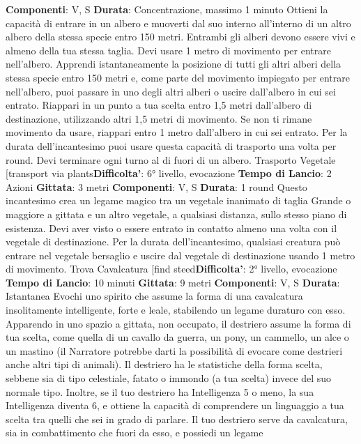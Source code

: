 \begin{multicols}{2}
\textbf{Componenti}: V, S
\textbf{Durata}: Concentrazione, massimo 1 minuto
Ottieni la capacità di entrare in un albero e muoverti dal
suo interno all’interno di un altro albero della stessa
specie entro 150 metri. Entrambi gli alberi devono
essere vivi e almeno della tua stessa taglia. Devi usare
1 metro di movimento per entrare nell’albero. Apprendi
istantaneamente la posizione di tutti gli altri alberi della
stessa specie entro 150 metri e, come parte del
movimento impiegato per entrare nell’albero, puoi
passare in uno degli altri alberi o uscire dall’albero in cui
sei entrato. Riappari in un punto a tua scelta entro 1,5
metri dall’albero di destinazione, utilizzando altri 1,5
metri di movimento. Se non ti rimane movimento da
usare, riappari entro 1 metro dall’albero in cui sei
entrato.
Per la durata dell’incantesimo puoi usare questa
capacità di trasporto una volta per round. Devi
terminare ogni turno al di fuori di un albero.
Trasporto Vegetale
[transport via plants\textbf{Difficolta'}:
6° livello, evocazione
\textbf{Tempo di Lancio}: 2 Azioni
\textbf{Gittata}: 3 metri
\textbf{Componenti}: V, S
\textbf{Durata}: 1 round
Questo incantesimo crea un legame magico tra un
vegetale inanimato di taglia Grande o maggiore a
gittata e un altro vegetale, a qualsiasi distanza, sullo
stesso piano di esistenza. Devi aver visto o essere
entrato in contatto almeno una volta con il vegetale di
destinazione. Per la durata dell’incantesimo, qualsiasi
creatura può entrare nel vegetale bersaglio e uscire dal
vegetale di destinazione usando 1 metro di
movimento.
Trova Cavalcatura
[find steed\textbf{Difficolta'}:
2° livello, evocazione
\textbf{Tempo di Lancio}: 10 minuti
\textbf{Gittata}: 9 metri
\textbf{Componenti}: V, S
\textbf{Durata}: Istantanea
Evochi uno spirito che assume la forma di una
cavalcatura insolitamente intelligente, forte e leale,
stabilendo un legame duraturo con esso. Apparendo in
uno spazio a gittata, non occupato, il destriero assume
la forma di tua scelta, come quella di un cavallo da
guerra, un pony, un cammello, un alce o un mastino (il
Narratore potrebbe darti la possibilità di evocare come
destrieri anche altri tipi di animali). Il destriero ha le
statistiche della forma scelta, sebbene sia di tipo
celestiale, fatato o immondo (a tua scelta) invece del
suo normale tipo. Inoltre, se il tuo destriero ha
Intelligenza 5 o meno, la sua Intelligenza diventa 6, e
ottiene la capacità di comprendere un linguaggio a tua
scelta tra quelli che sei in grado di parlare.
Il tuo destriero serve da cavalcatura, sia in
combattimento che fuori da esso, e possiedi un legame

\end{multicols}
